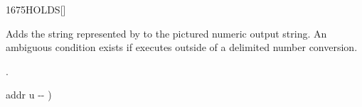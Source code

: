 
\begin{worddef}{1675}{HOLDS}[]%
\item {}

	Adds the string represented by  to the pictured numeric
	output string.  An ambiguous condition exists if  executes
	outside of a   delimited number conversion.

\see {}.

	\begin{implement} %
	\word{:}   addr u -{}- ) \\
	\tab[0.6]      \word{+}
	    \word{;}
	\end{implement}

	\begin{testing} %
	\end{testing}
\end{worddef}


